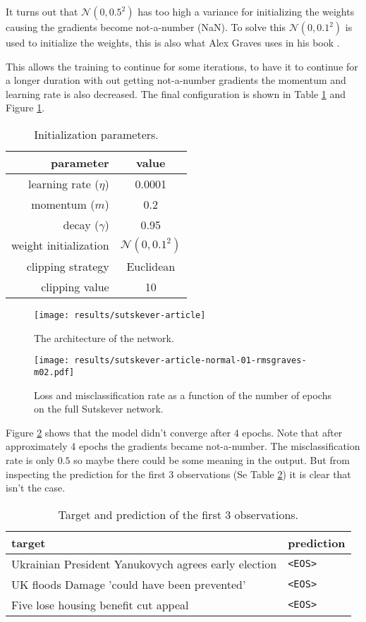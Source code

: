 It turns out that $\mathcal{N}(0, 0.5^2)$ has too high a variance for initializing the weights causing the gradients become not-a-number (NaN). To solve this $\mathcal{N}(0, 0.1^2)$ is used to initialize the weights, this is also what Alex Graves uses in his book \cite{alexgraves}.

This allows the training to continue for some iterations, to have it to continue for a longer duration with out getting not-a-number gradients the momentum and learning rate is also decreased. The final configuration is shown in Table \ref{fig:results:sutskever:article-parameters} and Figure \ref{fig:results:sutskever:article-artitecture}.
\begin{table}[h]
\centering
\begin{tabular}{r|c}
	parameter & value \\ \hline
	learning rate ($\eta$) & 0.0001 \\
	momentum ($m$) & 0.2 \\
	decay ($\gamma$) & 0.95 \\
	weight initialization & $\mathcal{N}(0, 0.1^2)$ \\
	clipping strategy & Euclidean \\
	clipping value & 10
\end{tabular}
\caption{Initialization parameters.}
\label{fig:results:sutskever:article-parameters}
\end{table}

\begin{figure}[h]
	\centering
	\texttt{[image: results/sutskever-article]}
	\caption{The architecture of the network.}
	\label{fig:results:sutskever:article-artitecture}
\end{figure}

\begin{figure}[H]
	\centering
	\texttt{[image: results/sutskever-article-normal-01-rmsgraves-m02.pdf]}
	\caption{Loss and misclassification rate as a function of the number of epochs on the full Sutskever network.}
	\label{fig:results:sutskever:article-learning}
\end{figure}

Figure \ref{fig:results:sutskever:article-learning} shows that the model didn't converge after 4 epochs. Note that after approximately 4 epochs the gradients became not-a-number. The misclassification rate is only $0.5$ so maybe there could be some meaning in the output. But from inspecting the prediction for the first 3 observations (Se Table \ref{fig:results:sutskever:predictions}) it is clear that isn't the case.
\begin{table}[h]
\centering
\begin{tabular}{p{9cm}|p{2cm}}
	target & prediction \\ \hline
	Ukrainian President Yanukovych agrees early election & \texttt{<EOS>} \\
	UK floods Damage 'could have been prevented' & \texttt{<EOS>} \\
	Five lose housing benefit cut appeal & \texttt{<EOS>}
\end{tabular}
\caption{Target and prediction of the first 3 observations.}
\label{fig:results:sutskever:predictions}
\end{table}

